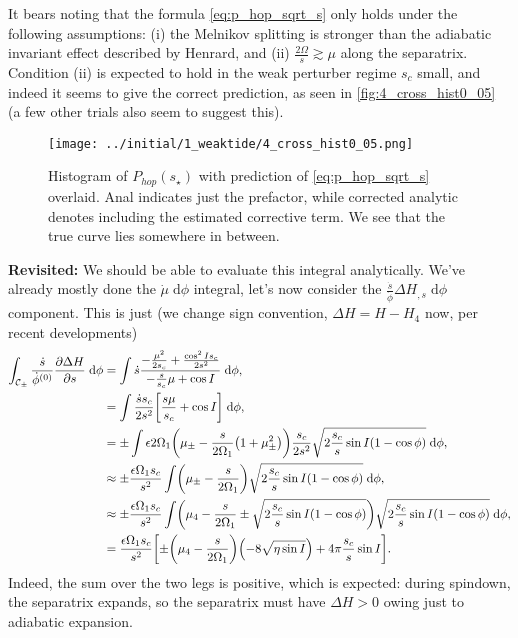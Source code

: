 \documentclass[11pt,
        usenames, %
        dvipsnames %
    ]{article}
\newcommand*{\pd}[2]{\frac{\partial#1}{\partial#2}}
\DeclarePairedDelimiter\p{\lparen}{\rparen}
\DeclarePairedDelimiter\s{\lbrack}{\rbrack}
\begin{document}
It bears noting that the formula \autoref{eq:p_hop_sqrt_s} only holds under the
following assumptions: (i) the Melnikov splitting is stronger than the adiabatic
invariant effect described by Henrard, and (ii) $\frac{2\Omega}{s} \gtrsim \mu$
along the separatrix. Condition (ii) is expected to hold in the weak perturber
regime $s_c$ small, and indeed it seems to give the correct prediction, as seen
in \autoref{fig:4_cross_hist0_05} (a few other trials also seem to suggest
this).
\begin{figure}[t]
    \centering
    \texttt{[image: ../initial/1\_weaktide/4\_cross\_hist0\_05.png]}
    \caption{Histogram of $P_{hop}(s_\star)$ with prediction of
    \autoref{eq:p_hop_sqrt_s} overlaid. Anal indicates just the prefactor, while
    corrected analytic denotes including the estimated corrective term. We see
    that the true curve lies somewhere in between.}\label{fig:4_cross_hist0_05}
\end{figure}

\textbf{Revisited:} We should be able to evaluate this integral analytically.
We've already mostly done the $\dot{\mu}\;\mathrm{d}\phi$ integral, let's now
consider the $\frac{\dot{s}}{\dot{\phi}}\Delta H_{,s}\;\mathrm{d}\phi$
component. This is just (we change sign convention, $\Delta H = H - H_4$ now,
per recent developments)
\begin{align*}
    \int_{\mathcal{C}_{\pm}} \frac{\dot{s}}{\dot{\phi}^{(0)}}
            \pd{\Delta H}{s}\;\mathrm{d}\phi &=
        \int \dot{s}\frac{-\frac{\mu^2}{2s_c} + \frac{\cos^2 Is_c}{2s^2}}{
            -\frac{s}{s_c}\mu + \cos I}\;\mathrm{d}\phi,\\
        &= \int \frac{\dot{s}s_c}{2s^2}\s*{\frac{s\mu}{s_c} + \cos
            I}\;\mathrm{d}\phi,\\
        &= \pm \int \epsilon 2\Omega_1
            \p*{\mu_{\pm} - \frac{s}{2\Omega_1}\p*{1 + \mu_{\pm}^2}}
                \frac{s_c}{2s^2} \sqrt{2\frac{s_c}{s} \sin I\p*{1 - \cos \phi}}
                \;\mathrm{d}\phi,\\
        &\approx \pm \frac{\epsilon \Omega_1 s_c}{s^2}
            \int \p*{\mu_{\pm} - \frac{s}{2\Omega_1}}
            \sqrt{2\frac{s_c}{s} \sin I\p*{1 - \cos \phi}} \;\mathrm{d}\phi,\\
        &\approx \pm\frac{\epsilon \Omega_1 s_c}{s^2}
            \int \p*{\mu_4 - \frac{s}{2\Omega_1} \pm
                \sqrt{2\frac{s_c}{s} \sin I\p*{1 - \cos \phi}}}
            \sqrt{2\frac{s_c}{s} \sin I\p*{1 - \cos \phi}} \;\mathrm{d}\phi,\\
        &= \frac{\epsilon \Omega_1 s_c}{s^2}\s*{
            \pm \p*{\mu_4 - \frac{s}{2\Omega_1}}\p*{-8\sqrt{\eta \sin I}}
                + 4\pi \frac{s_c}{s}\sin I}.
\end{align*}
Indeed, the sum over the two legs is positive, which is expected: during
spindown, the separatrix expands, so the separatrix must have $\Delta H > 0$
owing just to adiabatic expansion.
\end{document}
